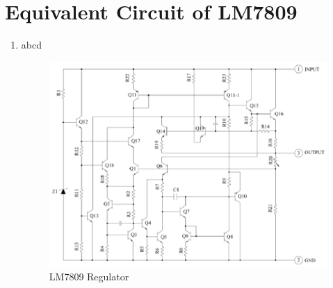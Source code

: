 \documentclass[journal,12pt,twocolumn]{IEEEtran}
\renewcommand\thesection{\arabic{section}}
\begin{document}
\section{Equivalent Circuit of LM7809}
\begin{enumerate}[label=\thesection.\arabic*,ref=\thesection.\theenumi]
\item abcd
\begin{figure}[!ht]
\centering	
\includegraphics[width=\columnwidth]{./figs/Mainfig.eps}
\caption{LM7809 Regulator}
\label{fig:orig}	
\end{figure}
\end{enumerate}
\end{document}
